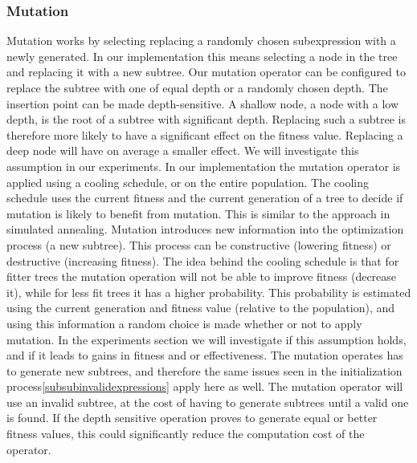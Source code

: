 \subsubsection{Mutation}
Mutation works by selecting replacing a randomly chosen subexpression with a newly generated. In our implementation this means selecting a node in the tree and replacing it with a new subtree. Our mutation operator can be configured to replace the subtree with one of equal depth or a randomly chosen depth. The insertion point can be made depth-sensitive. A shallow node, a node with a low depth, is the root of a subtree with significant depth. Replacing such a subtree is therefore more likely to have a significant effect on the fitness value. Replacing a deep node will have on average a smaller effect. We will investigate this assumption in our experiments.
In our implementation the mutation operator is applied using a cooling schedule, or on the entire population. 
The cooling schedule uses the current fitness and the current generation of a tree to decide if mutation is likely to benefit from mutation. This is similar to the approach in simulated annealing. %
Mutation introduces new information into the optimization process (a new subtree). This process can be constructive (lowering fitness) or destructive (increasing fitness). The idea behind the cooling schedule is that for fitter trees the mutation operation will not be able to improve fitness (decrease it), while for less fit trees it has a higher probability. 
This probability is estimated using the current generation and fitness value (relative to the population), and using this information a random choice is made whether or not to apply mutation. In the experiments section we will investigate if this assumption holds, and if it leads to gains in fitness and or effectiveness.
The mutation operates has to generate new subtrees, and therefore the same issues seen in the initialization  process\ref{subsubinvalidexpressions} apply here as well. The mutation operator will use an invalid subtree, at the cost of having to generate subtrees until a valid one is found. If the depth sensitive operation proves to generate equal or better fitness values, this could significantly reduce the computation cost of the operator.

